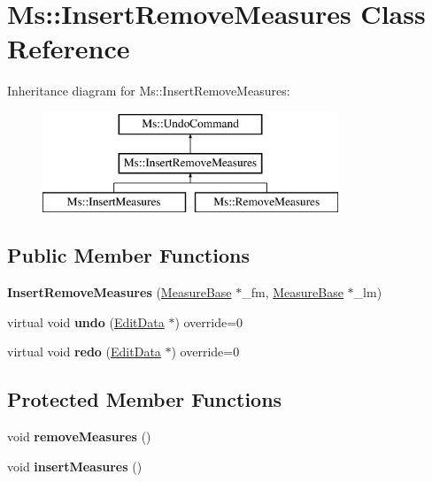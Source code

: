 \hypertarget{class_ms_1_1_insert_remove_measures}{}\section{Ms\+:\+:Insert\+Remove\+Measures Class Reference}
\label{class_ms_1_1_insert_remove_measures}
Inheritance diagram for Ms\+:\+:Insert\+Remove\+Measures\+:\begin{figure}[H]
\begin{center}
\leavevmode
\includegraphics[height=3.000000cm]{class_ms_1_1_insert_remove_measures}
\end{center}
\end{figure}
\subsection*{Public Member Functions}
\begin{DoxyCompactItemize}
\item 
\mbox{\label{class_ms_1_1_insert_remove_measures_abb984d3fcc23f0fef294f177157b7b77}} 
{\bfseries Insert\+Remove\+Measures} (\hyperlink{class_ms_1_1_measure_base}{Measure\+Base} $\ast$\+\_\+fm, \hyperlink{class_ms_1_1_measure_base}{Measure\+Base} $\ast$\+\_\+lm)
\item 
\mbox{\label{class_ms_1_1_insert_remove_measures_a06c6c5af6a2a5c6486133505aa90cefc}} 
virtual void {\bfseries undo} (\hyperlink{class_ms_1_1_edit_data}{Edit\+Data} $\ast$) override=0
\item 
\mbox{\label{class_ms_1_1_insert_remove_measures_a3d99a1621960ff25d8219829c9a53aed}} 
virtual void {\bfseries redo} (\hyperlink{class_ms_1_1_edit_data}{Edit\+Data} $\ast$) override=0
\end{DoxyCompactItemize}
\subsection*{Protected Member Functions}
\begin{DoxyCompactItemize}
\item 
\mbox{\label{class_ms_1_1_insert_remove_measures_a283cd7cd46d0a3694ed199a976f5f3c2}} 
void {\bfseries remove\+Measures} ()
\item 
\mbox{\label{class_ms_1_1_insert_remove_measures_a74188d4c5e242a0af662962b89a45c98}} 
void {\bfseries insert\+Measures} ()
\end{DoxyCompactItemize}


